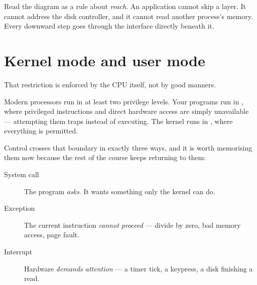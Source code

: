 \begin{mlfigure}
\end{mlfigure}

Read the diagram as a rule about \emph{reach}. An application cannot skip a layer. It cannot address the disk controller, and it cannot read another process's memory. Every downward step goes through the interface directly beneath it.

\section*{Kernel mode and user mode}
That restriction is enforced by the CPU itself, not by good manners.

Modern processors run in at least two privilege levels. Your programs run in , where privileged instructions and direct hardware access are simply unavailable --- attempting them traps instead of executing. The kernel runs in , where everything is permitted.

Control crosses that boundary in exactly three ways, and it is worth memorising them now because the rest of the course keeps returning to them:

\begin{description}
  \item[System call] The program \emph{asks}. It wants something only the kernel can do.
  \item[Exception] The current instruction \emph{cannot proceed} --- divide by zero, bad memory access, page fault.
  \item[Interrupt] Hardware \emph{demands attention} --- a timer tick, a keypress, a disk finishing a read.
\end{description}

